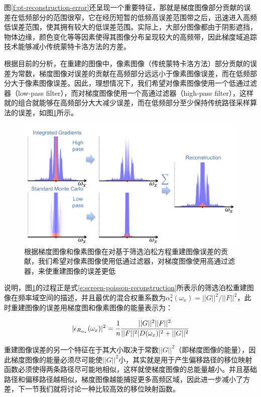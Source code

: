 图\ref{f:pt-reconstruction-error}还呈现一个重要特征，那就是梯度图像部分贡献的误差在低频部分的范围很窄，它在经历短暂的低频高误差范围带之后，迅速进入高频低误差范围，使其拥有较大的低误差范围。实际上，大部分图像都由于阴影遮挡，物体边缘，颜色变化等等因素使得其图像分布呈现较大的高频带，因此梯度域追踪技术能够减小传统蒙特卡洛方法的方差。

根据目前的分析，在重建的图像中，像素图像（传统蒙特卡洛方法）部分贡献的误差为常数，梯度图像对误差的贡献在高频部分远远小于像素图像误差，而在低频部分大于像素图像误差。因此，理想情况下，我们希望对像素图像使用一个低通过滤器（low-pass filter），而对梯度图像使用一个高通过滤器（high-pass filter），这样就的组合就能够在高频部分大大减少误差，而在低频部分至少保持传统路径采样算法的误差，如图\ref{f:pt-screen-poisson-reconstruction}所示。

\begin{figure}
	\includegraphics[width=1.\textwidth]{figures/pt/screen-poisson-reconstruction}
	\caption{根据梯度图像和像素图像在对基于筛选泊松方程重建图像误差的贡献，我们希望对像素图像使用低通过滤器，对梯度图像使用高通过滤器，来使重建图像的误差更低}
	\label{f:pt-screen-poisson-reconstruction}
\end{figure}

\cite{a:GradientDomainPathTracing}说明，图\ref{f:pt-screen-poisson-reconstruction}的过程正是式\ref{e:screen-poisson-reconstruction}所表示的筛选泊松重建图像在频率域空间的描述，并且最优的混合权重系数为$\alpha^{2}_{\star}(\omega_x)=||G||^2/||F||^2$，此时重建图像的误差用梯度图和像素图像的能量表示为：

\begin{equation}
	|\epsilon_{R_{\alpha_{\star}}}(\omega_x)|^2= \cfrac{1}{n} \cfrac{||G||^2 ||F||^2}{||F||^2|D(\omega_x)|^2+||G||^2}
\end{equation}

重建图像误差的另一个特征在于其大小取决于常数$||G||^2$（即梯度图像的能量），因此梯度图像的能量必须尽可能使$||G||^2$小，其实就是用于产生偏移路径的移位映射函数必须使得两条路径尽可能地相似，这样就使梯度图像的总能量越小。并且基础路径和偏移路径越相似，梯度图像越能捕捉更多高频区域，因此进一步减小了方差，下一节我们就将讨论一种比较高效的移位映射函数。





